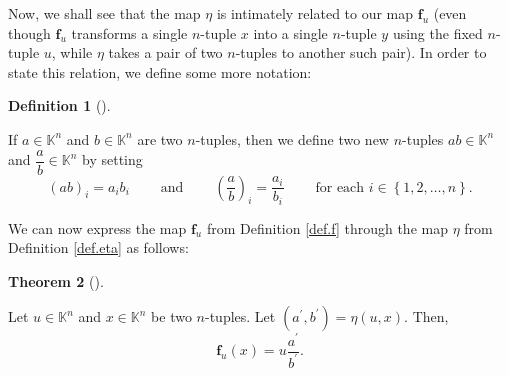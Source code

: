\documentclass[numbers=enddot,12pt,final,onecolumn,notitlepage]{scrartcl}%
\theoremstyle{definition}
\newtheorem{theo}{Theorem}[section]
\newenvironment{theorem}[1][]
{\begin{theo}[#1]\begin{leftbar}}
{\end{leftbar}\end{theo}}
\newtheorem{defi}[theo]{Definition}
\newenvironment{definition}[1][]
{\begin{defi}[#1]\begin{leftbar}}
{\end{leftbar}\end{defi}}
\begin{document}
Now, we shall see that the map $\eta$ is intimately related to our map
$\mathbf{f}_{u}$ (even though $\mathbf{f}_{u}$ transforms a single $n$-tuple
$x$ into a single $n$-tuple $y$ using the fixed $n$-tuple $u$, while $\eta$
takes a pair of two $n$-tuples to another such pair). In order to state this
relation, we define some more notation:

\begin{definition}
\label{def.n-tup-frac}If $a\in\mathbb{K}^{n}$ and $b\in\mathbb{K}^{n}$ are two
$n$-tuples, then we define two new $n$-tuples $ab\in\mathbb{K}^{n}$ and
$\dfrac{a}{b}\in\mathbb{K}^{n}$ by setting%
\[
\left(  ab\right)  _{i}=a_{i}b_{i}\ \ \ \ \ \ \ \ \ \ \text{and}%
\ \ \ \ \ \ \ \ \ \ \left(  \dfrac{a}{b}\right)  _{i}=\dfrac{a_{i}}{b_{i}%
}\ \ \ \ \ \ \ \ \ \ \text{for each }i\in\left\{  1,2,\ldots,n\right\}  .
\]

\end{definition}

We can now express the map $\mathbf{f}_{u}$ from Definition \ref{def.f}
through the map $\eta$ from Definition \ref{def.eta} as follows:

\begin{theorem}
\label{thm.eta-f1}Let $u\in\mathbb{K}^{n}$ and $x\in\mathbb{K}^{n}$ be two
$n$-tuples. Let $\left(  a^{\prime},b^{\prime}\right)  =\eta\left(
u,x\right)  $. Then,%
\[
\mathbf{f}_{u}\left(  x\right)  =u\dfrac{a^{\prime}}{b^{\prime}}.
\]

\end{theorem}
\end{document}
